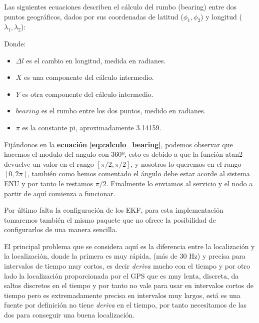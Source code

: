 Las siguientes ecuaciones describen el cálculo del rumbo (bearing) entre dos puntos geográficos, dados por sus coordenadas de 
latitud (\(\phi_1, \phi_2\)) y longitud (\(\lambda_1, \lambda_2\)):

Donde:
\begin{itemize}
    \item \(\Delta{l}\) es el cambio en longitud, medida en radianes.
    \item \(X\) es una componente del cálculo intermedio.
    \item \(Y\) es otra componente del cálculo intermedio.
    \item \({bearing}\) es el rumbo entre los dos puntos, medido en radianes.
    \item \(\pi\) es la constante pi, aproximadamente 3.14159.

\end{itemize}

Fijándonos en la \textbf{ecuación \ref{eq:calculo_bearing}}, podemos observar que hacemos el modulo del angulo con 360º, esto es debido 
a que la función atan2 devuelve un valor en el rango $[ \pi/2,\pi/2 ]$, y nosotros lo queremos en
el rango $[0, 2\pi]$, también como hemos comentado el ángulo debe estar acorde al sistema ENU y por tanto le restamos $\pi/2$. Finalmente 
lo enviamos al servicio y el nodo a partir de aquí comienza a funcionar.

Por último falta la configuración de los EKF, para esta implementación tomaremos también el mismo paquete que no ofrece la posibilidad de 
configurarlos de una manera sencilla.

El principal problema que se considera aquí es la diferencia entre la localización y la localización, donde la primera es muy rápida, 
(más de 30 Hz) y precisa para intervalos de tiempo muy cortos, es decir \textit{deriva} mucho con el tiempo y por otro
lado la localización proporcionada por el GPS que es muy lenta, discreta, da saltos discretos en el tiempo y por tanto no vale para usar en 
intervalos cortos de tiempo pero es extremadamente precisa en intervalos muy largos, está es una fuente por definición no tiene
\textit{deriva} en el tiempo, por tanto necesitamos de las dos para conseguir una buena localización.

